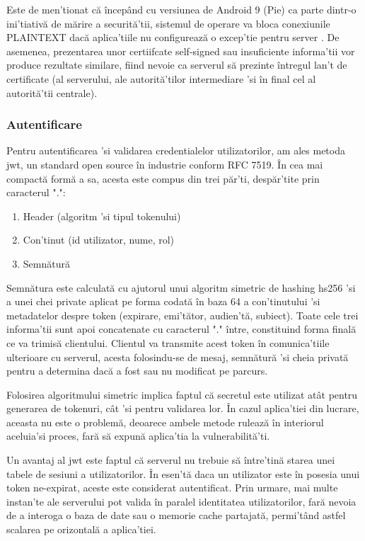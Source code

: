 Este de men'tionat că începând cu versiunea de Android 9 (Pie) ca parte dintr-o ini'tiativă de mărire a securită'tii, sistemul de operare va bloca conexiunile PLAINTEXT dacă aplica'tiile nu configurează o excep'tie pentru server \cite{Digicert2018}. De asemenea, prezentarea unor certiifcate self-signed sau insuficiente informa'tii vor produce rezultate similare, fiind nevoie ca serverul să prezinte întregul lan't de certificate (al serverului, ale autorită'tilor intermediare 'si în final cel al autorită'tii centrale). 

\subsubsection {Autentificare}

Pentru autentificarea 'si validarea credentialelor utilizatorilor, am ales metoda \acrfull{jwt}, un standard open source în industrie conform RFC 7519. În cea mai compactă formă a sa, acesta este compus din trei păr'ti, despăr'tite prin caracterul ".":

\begin{enumerate}
  \item Header (algoritm 'si tipul tokenului)
  \item Con'tinut (id utilizator, nume, rol)
  \item Semnătură
\end{enumerate}

Semnătura este calculată cu ajutorul unui algoritm simetric de hashing \acrfull{hs256} 'si a unei chei private aplicat pe forma codată în baza 64 a con'tinutului 'si metadatelor despre token (expirare, emi'tător, audien'tă, subiect). Toate cele trei informa'tii sunt apoi concatenate cu caracterul "." între, constituind forma finală ce va trimisă clientului. Clientul va transmite acest token în comunica'tiile ulterioare cu serverul, acesta folosindu-se de mesaj, semnătură 'si cheia privată pentru a determina dacă a fost sau nu modificat pe parcurs.

Folosirea algoritmului simetric implica faptul că secretul este utilizat atât pentru generarea de tokenuri, cât 'si pentru validarea lor. În cazul aplica'tiei din lucrare, aceasta nu este o problemă, deoarece ambele metode rulează în interiorul aceluia'si proces, fară să expună aplica'tia la vulnerabilită'ti.

Un avantaj al \acrshort{jwt} este faptul că serverul nu trebuie să între'tină starea unei tabele de sesiuni a utilizatorilor. În esen'tă daca un utilizator este în posesia unui token ne-expirat, aceste este considerat autentificat. Prin urmare, mai multe instan'te ale serverului pot valida în paralel identitatea utilizatorilor, fară nevoia de a interoga o baza de date sau o memorie cache partajată, permi'tând astfel scalarea pe orizontală a aplica'tiei.

